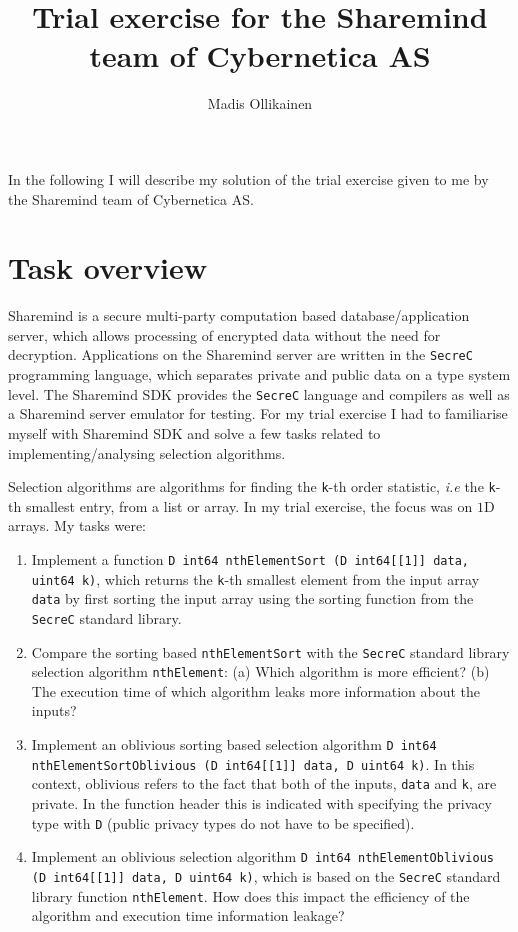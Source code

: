 \documentclass[11pt]{article}
\author{Madis Ollikainen}
\title{Trial exercise for the Sharemind team of Cybernetica AS}
\newcommand{\ct}[1]{\texttt{#1}}
\newcommand{\SC}{\ct{SecreC}\xspace}
\begin{document}
\maketitle

In the following I will describe my solution of the trial exercise given to me by the Sharemind team of Cybernetica AS.

\section{Task overview} %
\label{sec:task_overview}

Sharemind is a secure multi-party computation based database/application server, which allows processing of encrypted data without the need for decryption. Applications on the Sharemind server are written in the \SC programming language, which separates private and public data on a type system level. The Sharemind SDK provides the \SC language and compilers as well as a Sharemind server emulator for testing. For my trial exercise I had to familiarise myself with Sharemind SDK and solve a few tasks related to implementing/analysing selection algorithms.

Selection algorithms are algorithms for finding the \ct{k}-th order statistic, \emph{i.e} the \ct{k}-th smallest entry, from a list or array. In my trial exercise, the focus was on $1$D arrays. My tasks were:

\begin{enumerate}
      	\item Implement a function \ct{D int64 nthElementSort (D int64[[1]] data, uint64 k)}, which returns the \ct{k}-th smallest element from the input array \ct{data} by first sorting the input array using the sorting function from the \SC standard library.

      	\item Compare the sorting based \ct{nthElementSort} with the \SC standard library selection algorithm \ct{nthElement}: (a) Which algorithm is more efficient? (b) The execution time of which algorithm leaks more information about the inputs? 

      	\item Implement an oblivious sorting based selection algorithm \ct{D int64 nthElementSortOblivious (D int64[[1]] data, D uint64 k)}. In this context, oblivious refers to the fact that both of the inputs, \ct{data} and \ct{k}, are private. In the function header this is indicated with specifying the privacy type with \ct{D} (public privacy types do not have to be specified). 

      	\item Implement an oblivious selection algorithm \ct{D int64 nthElementOblivious (D int64[[1]] data, D uint64 k)}, which is based on the \SC standard library function \ct{nthElement}. How does this impact the efficiency of the algorithm and execution time information leakage? 
\end{enumerate}      
\end{document}
